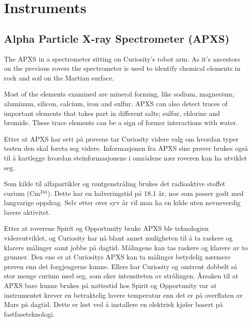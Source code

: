 \documentclass[5p]{elsarticle}
\renewenvironment{abstract}{\global\setbox\absbox=\vbox\bgroup
\hsize=\textwidth\def\baselinestretch{1}%
\noindent\unskip\textbf{Introduction}
\par\medskip\noindent\unskip\ignorespaces}
{\egroup}
\begin{document}

\section*{Instruments}
\subsection*{Alpha Particle X-ray Spectrometer (APXS)}
The APXS in a spectrometer sitting on Curiosity's robot arm.
As it's ancestors on the previous rovers the spectrometer is used to identify chemical elements in rock and soil on the Martian surface.

Most of the elements examined are mineral forming, like sodium, magnesium, aluminum, silicon, calcium, iron and sulfur.
APXS can also detect traces of important elements that takes part in different salts; sulfur, chlorine and bromide.
These trace elements can be a sign of former interactions with water.

Etter at APXS har sett på prøvene tar Curiosity videre valg om hvordan typer testen den skal foreta seg videre.
Informasjonen fra APXS sine prøver brukes også til å kartlegge hvordan steinformasjonene i områdene nær roveren kan ha utviklet seg.

Som kilde til alfapartikler og røntgenstråling brukes det radioaktive stoffet curium (Cm$^{244}$).
Dette har en halveringstid på 18.1 år, noe som passer godt med langvarige oppdrag.
Selv etter over syv år vil man ha en kilde uten nevneverdig lavere aktivitet.

Etter at roverene Spirit og Opportunity bruke APXS ble teknologien videreutviklet, og Curiosity har nå blant annet muligheten til å ta raskere og klarere målinger samt jobbe på dagtid.
Målingene kan tas raskere og klarere av to grunner.
Den ene er at Curiositys APXS kan ta målinger betydelig nærmere prøven enn det forgjengerne kunne.
Ellers har Curiosity og omtrent dobbelt så stor menge curium med seg, som øker intensiteten av strålingen.
Årsaken til at APXS bare kunne brukes på nattestid hos Spirit og Opportunity var at instrumentet krever en betraktelig lavere temperatur enn det er på overflaten av Mars på dagtid.
Dette er løst ved å installere en elektrisk kjøler basert på fastfaseteknologi.
\end{document}
